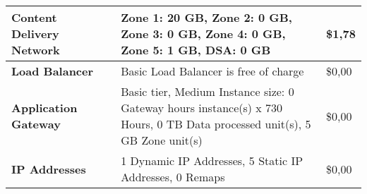 \begin{adjustbox}{angle=90}
\begin{tabularx}{\textheight}{|l|X|X|X|}
                \textbf{Content Delivery Network} &                           & Zone 1: 20 GB, Zone 2: 0 GB, Zone 3: 0 GB, Zone 4: 0 GB, Zone 5: 1 GB, DSA: 0 GB                                                                                                                                                                 & \$1,78                                   \\ \hline
                \textbf{Load Balancer}            &                           & Basic Load Balancer is free of charge                                                                                                                                                                                                            & \$0,00                                   \\ \hline
                \textbf{Application Gateway}      &                           & Basic tier, Medium Instance size: 0 Gateway hours instance(s) x 730 Hours, 0 TB Data processed unit(s), 5 GB Zone unit(s)                                                                                                                        & \$0,00                                   \\ \hline
                \textbf{IP Addresses}             &                           & 1 Dynamic IP Addresses, 5 Static IP Addresses, 0 Remaps                                                                                                                                                                                          & \$0,00                                   \\ \hline
                
                \end{tabularx}
                \label{azPriceT1_1}
\end{adjustbox}